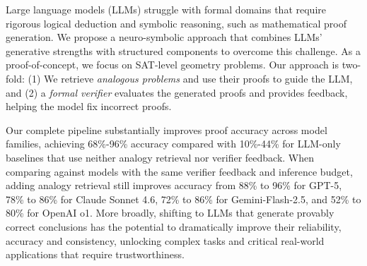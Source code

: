 





Large language models (LLMs) struggle with formal domains that require rigorous logical deduction and symbolic reasoning, such as mathematical proof generation. 
We propose a neuro-symbolic approach that combines LLMs' generative strengths with structured components to overcome this challenge. 
As a proof-of-concept, we focus on SAT-level geometry problems.
%
%
%
%
Our approach is two-fold: 
(1) We retrieve \emph{analogous problems} and use their proofs to guide the LLM, and 
(2) a \emph{formal verifier} evaluates the generated proofs and provides feedback, helping the model fix incorrect proofs. 


Our complete pipeline substantially improves proof accuracy across model families, achieving 68\%-96\% accuracy compared with 10\%-44\% for LLM-only baselines that use neither analogy retrieval nor verifier feedback. When comparing against models with the same verifier feedback and inference budget, adding analogy retrieval still improves accuracy from 88\% to 96\% for GPT-5, 78\% to 86\% for Claude Sonnet 4.6, 72\% to 86\% for Gemini-Flash-2.5, and 52\% to 80\% for OpenAI o1.
More broadly, shifting to LLMs that generate provably correct conclusions has the potential to dramatically improve their reliability, accuracy and consistency, unlocking complex tasks and critical real-world applications that require trustworthiness.






